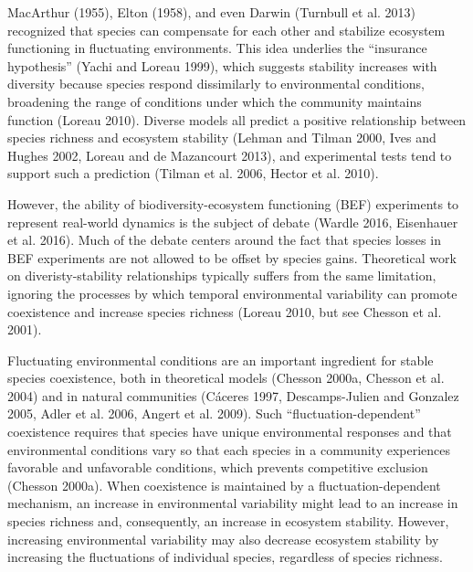 \documentclass[12pt,]{article}
\begin{document}
MacArthur (1955), Elton (1958), and even Darwin (Turnbull et al. 2013)
recognized that species can compensate for each other and stabilize
ecosystem functioning in fluctuating environments. This idea underlies
the ``insurance hypothesis'' (Yachi and Loreau 1999), which suggests
stability increases with diversity because species respond dissimilarly
to environmental conditions, broadening the range of conditions under
which the community maintains function (Loreau 2010). Diverse models all
predict a positive relationship between species richness and ecosystem
stability (Lehman and Tilman 2000, Ives and Hughes 2002, Loreau and {{de
Mazancourt}} 2013), and experimental tests tend to support such a
prediction (Tilman et al. 2006, Hector et al. 2010).

However, the ability of biodiversity-ecosystem functioning (BEF)
experiments to represent real-world dynamics is the subject of debate
(Wardle 2016, Eisenhauer et al. 2016). Much of the debate centers around
the fact that species losses in BEF experiments are not allowed to be
offset by species gains. Theoretical work on diveristy-stability
relationships typically suffers from the same limitation, ignoring the
processes by which temporal environmental variability can promote
coexistence and increase species richness (Loreau 2010, but see Chesson
et al. 2001).

Fluctuating environmental conditions are an important ingredient for
stable species coexistence, both in theoretical models (Chesson 2000a,
Chesson et al. 2004) and in natural communities (C{á}ceres 1997,
Descamps-Julien and Gonzalez 2005, Adler et al. 2006, Angert et al.
2009). Such ``fluctuation-dependent'' coexistence requires that species
have unique environmental responses and that environmental conditions
vary so that each species in a community experiences favorable and
unfavorable conditions, which prevents competitive exclusion (Chesson
2000a). When coexistence is maintained by a fluctuation-dependent
mechanism, an increase in environmental variability might lead to an
increase in species richness and, consequently, an increase in ecosystem
stability. However, increasing environmental variability may also
decrease ecosystem stability by increasing the fluctuations of
individual species, regardless of species richness.
\end{document}
